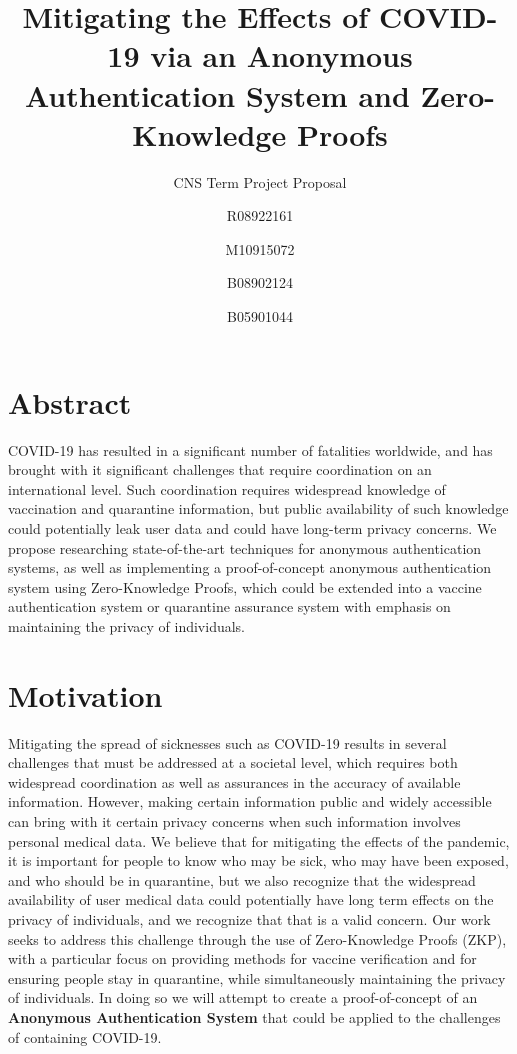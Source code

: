 \documentclass[sigconf, nonacm=true]{acmart}
\title{Mitigating the Effects of COVID-19 via an Anonymous Authentication System and Zero-Knowledge Proofs}
\subtitle{CNS Term Project Proposal}
\author{
    R08922161 \and
    M10915072 \and
    B08902124 \and
    B05901044
}
\begin{document}
\maketitle

\section{Abstract}

COVID-19 has resulted in a significant number of fatalities worldwide, and has brought with it significant challenges that require coordination on an international level. Such coordination requires widespread knowledge of vaccination and quarantine information, but public availability of such knowledge could potentially leak user data and could have long-term privacy concerns. We propose researching state-of-the-art techniques for anonymous authentication systems, as well as implementing a proof-of-concept anonymous authentication system using Zero-Knowledge Proofs, which could be extended into a vaccine authentication system or quarantine assurance system with emphasis on maintaining the privacy of individuals.

\section{Motivation}

Mitigating the spread of sicknesses such as COVID-19 results in several challenges that must be addressed at a societal level, which requires both widespread coordination as well as assurances in the accuracy of available information. However, making certain information public and widely accessible can bring with it certain privacy concerns when such information involves personal medical data. We believe that for mitigating the effects of the pandemic, it is important for people to know who may be sick, who may have been exposed, and who should be in quarantine, but we also recognize that the widespread availability of user medical data could potentially have long term effects on the privacy of individuals, and we recognize that that is a valid concern. Our work seeks to address this challenge through the use of Zero-Knowledge Proofs (ZKP), with a particular focus on providing methods for vaccine verification and for ensuring people stay in quarantine, while simultaneously maintaining the privacy of individuals. In doing so we will attempt to create a proof-of-concept of an \textbf{Anonymous Authentication System} that could be applied to the challenges of containing COVID-19.
\end{document}
